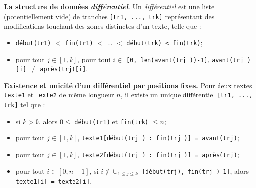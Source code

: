 \textbf{La structure de données \textit{différentiel}}. Un \textit{différentiel} est une liste (potentiellement vide)
de tranches \lstinline{[tr1, ..., trk]} représentant des modifications touchant des zones distinctes d’un
texte, telle que :
\begin{itemize}
\item \lstinline{début(tr1)} $<$ \lstinline{fin(tr1)} $<$ ... $<$ \lstinline{début(trk) < fin(trk)};
\item pour tout $j \in [1, k]$, pour tout $i \in$ \lstinline{[0, len(avant(trj ))-1]}, \lstinline{avant(trj )[i]} $\neq$ \lstinline{après(trj)[i]}.  
\end{itemize}

\textbf{Existence et unicité d’un différentiel par positions fixes.} Pour deux textes \lstinline{texte1} et
\lstinline{texte2} de même longueur $n$, il existe un unique différentiel \lstinline{[tr1, ..., trk]} tel que :
\begin{itemize}
\item si $k > 0$, alors $0 \leq$ \lstinline{début(tr1)} et \lstinline{fin(trk)} $\leq n $;
\item pour tout $j \in [1, k]$, \lstinline{texte1[début(trj ) : fin(trj )] = avant(trj)};
\item pour tout $j \in [1, k]$, \lstinline{texte2[début(trj ) : fin(trj )] = après(trj)};
\item pour tout $i \in [0, n-1]$, si $i \notin \cup_{1\leq j \leq k}$
\lstinline{[début(trj), fin(trj )-1]}, alors \lstinline{texte1[i] = texte2[i]}.
\end{itemize}
